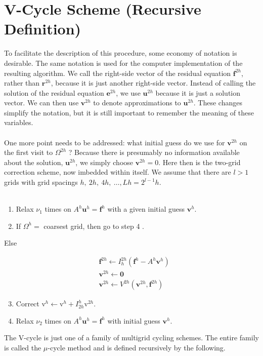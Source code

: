 \documentclass[11pt]{book}
\begin{document}
\section*{V-Cycle Scheme (Recursive Definition)}
To facilitate the description of this procedure, some economy of notation is desirable. The same notation is used for the computer implementation of the resulting algorithm. We call the right-side vector of the residual equation $\mathbf{f}^{2 h}$, rather than $\mathbf{r}^{2 h}$, because it is just another right-side vector. Instead of calling the solution of the residual equation $\mathbf{e}^{2 h}$, we use $\mathbf{u}^{2 h}$ because it is just a solution vector. We can then use $\mathbf{v}^{2 h}$ to denote approximations to $\mathbf{u}^{2 h}$. These changes simplify the notation, but it is still important to remember the meaning of these variables. \\ \\
One more point needs to be addressed: what initial guess do we use for $\mathbf{v}^{2 h}$ on the first visit to $\Omega^{2 h}$ ? Because there is presumably no information available about the solution, $\mathbf{u}^{2 h}$, we simply choose $\mathbf{v}^{2 h}=0$. Here then is the two-grid correction scheme, now imbedded within itself. We assume that there are $l>1$ grids with grid spacings $h, \ 2 h, \  4 h, \ \ldots, L h=2^{l-1} h$.\\ \\ 
\begin{enumerate}
  \item Relax $\nu_{1}$ times on $A^{h} \mathbf{u}^{h}=\mathbf{f}^{h}$ with a given initial guess $\mathbf{v}^{h}$.

  \item If $\Omega^{h}=$ coarsest grid, then go to step 4 .
\end{enumerate}

Else

$$
\begin{aligned}
& \mathbf{f}^{2 h} \leftarrow I_{h}^{2 h}\left(\mathbf{f}^{h}-A^{h} \mathbf{v}^{h}\right) \\
& \mathbf{v}^{2 h} \leftarrow \mathbf{0} \\
& \mathbf{v}^{2 h} \leftarrow V^{2 h}\left(\mathbf{v}^{2 h}, \mathbf{f}^{2 h}\right)
\end{aligned}
$$

\begin{enumerate}
  \setcounter{enumi}{2}
  \item Correct $\mathrm{v}^{h} \leftarrow \mathrm{v}^{h}+I_{2 h}^{h} \mathrm{v}^{2 h}$.

  \item Relax $\nu_{2}$ times on $A^{h} \mathbf{u}^{h}=\mathbf{f}^{h}$ with initial guess $\mathbf{v}^{h}$.
\end{enumerate}
  The V-cycle is just one of a family of multigrid cycling schemes. The entire family is called the $\mu$-cycle method and is defined recursively by the following.
\end{document}
